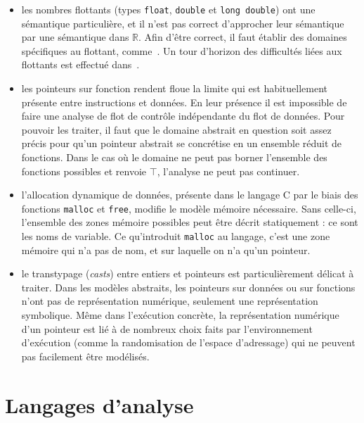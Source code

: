 \begin{itemize}
\item les nombres flottants
(types \texttt{float}, \texttt{double} et \texttt{long double}) ont une
sémantique particulière, et il n'est pas correct d'approcher leur sémantique
par une sémantique dans $ℝ$. Afin d'être correct, il faut établir des domaines
spécifiques au flottant, comme~\cite{floatpoly}. Un tour d'horizon des
difficultés liées aux flottants est effectué dans~\cite{floatpitfalls}.

\item les pointeurs sur fonction
rendent floue la limite qui est habituellement présente entre instructions et
données. En leur présence il est impossible de faire une analyse de flot de
contrôle indépendante du flot de données. Pour pouvoir les traiter, il faut que
le domaine abstrait en question soit assez précis pour qu'un pointeur abstrait
se concrétise en un ensemble réduit de fonctions. Dans le cas où le domaine ne
peut pas borner l'ensemble des fonctions possibles et renvoie $\top$, l'analyse
ne peut pas continuer.

\item l'allocation dynamique
de données, présente dans le langage C par le biais des fonctions
\texttt{malloc} et \texttt{free}, modifie le modèle mémoire
nécessaire. Sans celle-ci, l'ensemble des zones mémoire possibles peut être
décrit statiquement : ce sont les noms de variable. Ce qu'introduit
\texttt{malloc} au langage, c'est une zone mémoire qui n'a pas de nom, et sur
laquelle on n'a qu'un pointeur.


\item le transtypage (\emph{casts}) entre entiers et pointeurs
est particulièrement délicat à traiter. Dans les modèles abstraits, les
pointeurs sur données ou sur fonctions n'ont pas de représentation numérique,
seulement une représentation symbolique. Même dans l'exécution concrète, la
représentation numérique d'un pointeur est lié à de nombreux choix faits par
l'environnement d'exécution (comme la randomisation de l'espace d'adressage) qui
ne peuvent pas facilement être modélisés.

\end{itemize}




\section{Langages d'analyse}

